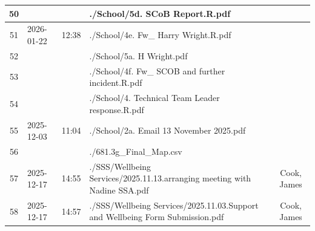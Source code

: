 \begin{landscape}
\begin{tabularx}{\linewidth}{|c|l|l|X|c|c|}
		50                               &                     &                & ./School/5d. SCoB Report.R.pdf                                                                                         &                         &                          \\ \hline
		51                               & 2026-01-22          & 12:38          & ./School/4e. Fw\_ Harry Wright.R.pdf                                                                                   &                         &                          \\ \hline
		52                               &                     &                & ./School/5a. H Wright.pdf                                                                                              &                         &                          \\ \hline
		53                               &                     &                & ./School/4f. Fw\_ SCOB and further incident.R.pdf                                                                      &                         &                          \\ \hline
		54                               &                     &                & ./School/4. Technical Team Leader response.R.pdf                                                                       &                         &                          \\ \hline
		55                               & 2025-12-03          & 11:04          & ./School/2a. Email 13 November 2025.pdf                                                                                &                         &                          \\ \hline
		56                               &                     &                & ./681.3g\_Final\_Map.csv                                                                                               &                         &                          \\ \hline
		57                               & 2025-12-17          & 14:55          & ./SSS/Wellbeing Services/2025.11.13.arranging meeting with Nadine SSA.pdf                                              &                         & Cook, James              \\ \hline
		58                               & 2025-12-17          & 14:57          & ./SSS/Wellbeing Services/2025.11.03.Support and Wellbeing Form Submission.pdf                                          &                         & Cook, James              \\ \hline

\end{tabularx}
\end{landscape}
